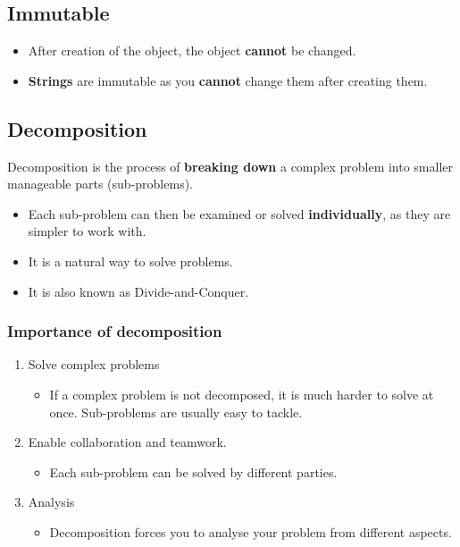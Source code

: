 \documentclass[11pt]{article}
\begin{document}
\subsection{Immutable}
\label{sec:orgd947ff7}
\begin{itemize}
\item After creation of the object, the object \textbf{cannot} be changed.
\item \textbf{Strings} are immutable as you \textbf{cannot} change them after creating them.
\end{itemize}

\subsection{Decomposition}
\label{sec:org61df6dc}
Decomposition is the process of \textbf{breaking down} a complex problem into smaller manageable parts (sub-problems).
\begin{itemize}
\item Each sub-problem can then be examined or solved \textbf{individually}, as they are simpler to work with.
\item It is a natural way to solve problems.
\item It is also known as Divide-and-Conquer.
\end{itemize}

\subsubsection{Importance of decomposition}
\label{sec:orgfdbe107}
\begin{enumerate}
\item Solve complex problems
\begin{itemize}
\item If a complex problem is not decomposed, it is much harder to solve at once. Sub-problems are usually easy to tackle.
\end{itemize}

\item Enable collaboration and teamwork.
\begin{itemize}
\item Each sub-problem can be solved by different parties.
\end{itemize}

\item Analysis
\begin{itemize}
\item Decomposition forces you to analyse your problem from different aspects.
\end{itemize}
\end{enumerate}
\end{document}

